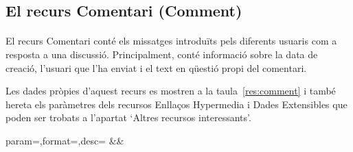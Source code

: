 \subsection{El recurs Comentari (Comment)}

    \paragraph{}
    El recurs Comentari conté els missatges introduïts pels diferents usuaris com a resposta a una discussió. Principalment, conté informació sobre la data de creació, l'usuari que l'ha enviat i el text en qüestió propi del comentari.

    Les dades pròpies d'aquest recurs es mostren a la taula~\ref{res:comment} i també hereta els paràmetres dels recursos Enllaços Hypermedia i Dades Extensibles que poden ser trobats a l'apartat `Altres recursos interessants'.

    \clearpage

    \begin{center}
             {param=\param,format=\format,desc=\desc}
             {\param&\format&\desc}
     \end{center}
